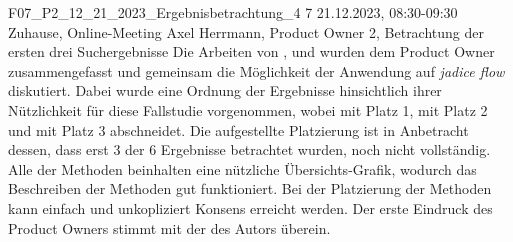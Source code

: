 \fieldnote
{F07\_P2\_12\_21\_2023\_Ergebnisbetrachtung\_4}
{7}
{21.12.2023, 08:30-09:30}
{Zuhause, Online-Meeting}
{Axel Herrmann, Product Owner}
{2, Betrachtung der ersten drei Suchergebnisse}
{
	Die Arbeiten von ,  und  wurden dem Product Owner zusammengefasst und gemeinsam die Möglichkeit der Anwendung auf \emph{jadice flow} diskutiert.
  Dabei wurde eine Ordnung der Ergebnisse hinsichtlich ihrer Nützlichkeit für diese Fallstudie vorgenommen, wobei  mit Platz 1,  mit Platz 2 und  mit Platz 3 abschneidet.
}
{
	Die aufgestellte Platzierung ist in Anbetracht dessen, dass erst 3 der 6 Ergebnisse betrachtet wurden, noch nicht vollständig.
}
{
  Alle der Methoden beinhalten eine nützliche Übersichts-Grafik, wodurch das Beschreiben der Methoden gut funktioniert.
  Bei der Platzierung der Methoden kann einfach und unkopliziert Konsens erreicht werden.
  Der erste Eindruck des Product Owners stimmt mit der des Autors überein.
}
{}
{
}
